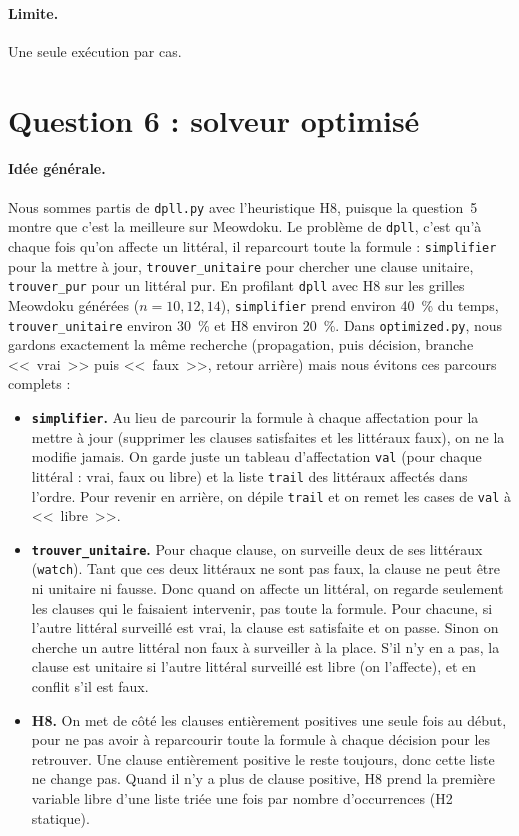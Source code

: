 \documentclass[11pt,a4paper]{article}
\newcommand{\f}[1]{\texttt{#1}}
\begin{document}
\paragraph{Limite.} Une seule exécution par cas.

\section*{Question 6 : solveur optimisé}

\paragraph{Idée générale.} Nous sommes partis de \f{dpll.py} avec l'heuristique H8, puisque la question~5 montre que c'est la meilleure sur Meowdoku. Le problème de \f{dpll}, c'est qu'à chaque fois qu'on affecte un littéral, il reparcourt toute la formule : \f{simplifier} pour la mettre à jour, \f{trouver\_unitaire} pour chercher une clause unitaire, \f{trouver\_pur} pour un littéral pur. En profilant \f{dpll} avec H8 sur les grilles Meowdoku générées ($n=10,12,14$), \f{simplifier} prend environ 40~\% du temps, \f{trouver\_unitaire} environ 30~\% et H8 environ 20~\%. Dans \f{optimized.py}, nous gardons exactement la même recherche (propagation, puis décision, branche <<~vrai~>> puis <<~faux~>>, retour arrière) mais nous évitons ces parcours complets :
\begin{itemize}
  \item \textbf{\f{simplifier}.} Au lieu de parcourir la formule à chaque affectation pour la mettre à jour (supprimer les clauses satisfaites et les littéraux faux), on ne la modifie jamais. On garde juste un tableau d'affectation \f{val} (pour chaque littéral : vrai, faux ou libre) et la liste \f{trail} des littéraux affectés dans l'ordre. Pour revenir en arrière, on dépile \f{trail} et on remet les cases de \f{val} à <<~libre~>>.
  \item \textbf{\f{trouver\_unitaire}.} Pour chaque clause, on surveille deux de ses littéraux (\f{watch}). Tant que ces deux littéraux ne sont pas faux, la clause ne peut être ni unitaire ni fausse. Donc quand on affecte un littéral, on regarde seulement les clauses qui le faisaient intervenir, pas toute la formule. Pour chacune, si l'autre littéral surveillé est vrai, la clause est satisfaite et on passe. Sinon on cherche un autre littéral non faux à surveiller à la place. S'il n'y en a pas, la clause est unitaire si l'autre littéral surveillé est libre (on l'affecte), et en conflit s'il est faux.
  \item \textbf{H8.} On met de côté les clauses entièrement positives une seule fois au début, pour ne pas avoir à reparcourir toute la formule à chaque décision pour les retrouver. Une clause entièrement positive le reste toujours, donc cette liste ne change pas. Quand il n'y a plus de clause positive, H8 prend la première variable libre d'une liste triée une fois par nombre d'occurrences (H2 statique).
\end{itemize}
\end{document}
